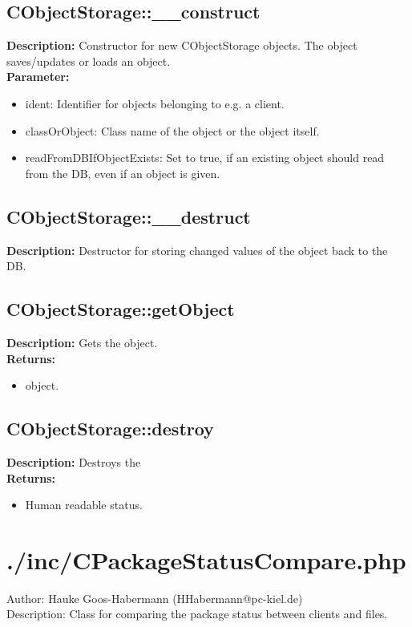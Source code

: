 \subsection{CObjectStorage::\_\_construct}
\textbf{Description:} Constructor for new CObjectStorage objects. The object saves/updates or loads an object.\\
\textbf{Parameter:}
\begin{itemize}
\item ident: Identifier for objects belonging to e.g. a client.
\item classOrObject: Class name of the object or the object itself.
\item readFromDBIfObjectExists: Set to true, if an existing object should read from the DB, even if an object is given.
\end{itemize}

\subsection{CObjectStorage::\_\_destruct}
\textbf{Description:} Destructor for storing changed values of the object back to the DB.\\

\subsection{CObjectStorage::getObject}
\textbf{Description:} Gets the object.\\
\textbf{Returns:}
\begin{itemize}
\item object.
\end{itemize}

\subsection{CObjectStorage::destroy}
\textbf{Description:} Destroys the \\
\textbf{Returns:}
\begin{itemize}
\item Human readable status.
\end{itemize}

\newpage\section{./inc/CPackageStatusCompare.php}
 Author: Hauke Goos-Habermann (HHabermann@pc-kiel.de)\\
 Description: Class for comparing the package status between clients and files.\\

